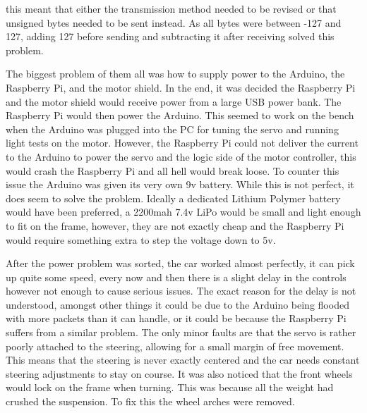 this meant that either the transmission method needed to be revised or that unsigned bytes
needed to be sent instead. As all bytes were between -127 and 127, adding 127 before sending
and subtracting it after receiving solved this problem.
\par
The biggest problem of them all was how to supply power to the Arduino,
the Raspberry Pi, and the motor shield. In the end, it was decided the Raspberry Pi and
the motor shield would receive power from a large USB power bank. The Raspberry Pi would
then power the Arduino. This seemed to work on the bench when the Arduino was plugged into
the PC for tuning the servo and running light tests on the motor. However, the Raspberry Pi
could not deliver the current to the Arduino to power the servo and the logic side of the
motor controller, this would crash the Raspberry Pi and all hell would break loose.
To counter this issue the Arduino was given its very own 9v battery. While this is not
perfect, it does seem to solve the problem. Ideally a dedicated Lithium Polymer
battery would have been preferred, a 2200mah 7.4v LiPo would be small and light enough
to fit on the frame, however, they are not exactly cheap and the Raspberry Pi would require
something extra to step the voltage down to 5v.
\par
After the power problem was sorted, the car worked almost perfectly, it can pick up quite
some speed, every now and then there is a slight delay in the controls however not enough
to cause serious issues. The exact reason for the delay is not understood, amongst other things
it could be due to the Arduino being flooded with more packets than it can handle, or it
could be because the Raspberry Pi suffers from a similar problem. The only minor faults are
that the servo is rather poorly attached to the steering, allowing for a small margin of
free movement. This means that the steering is never exactly centered and the car needs
constant steering adjustments to stay on course. It was also noticed that the front wheels
would lock on the frame when turning. This was because all the weight had crushed the suspension.
To fix this the wheel arches were removed.
